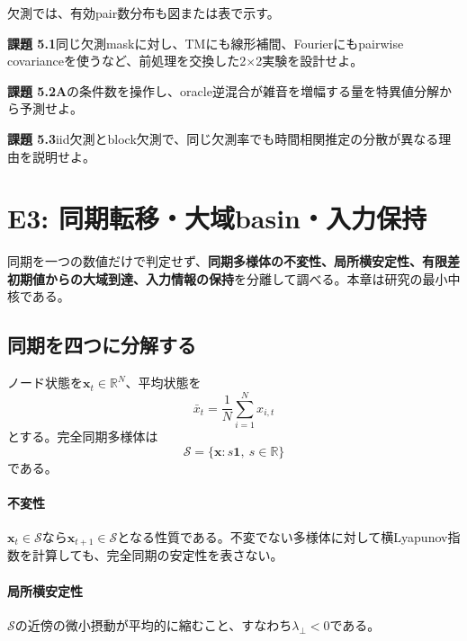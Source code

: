\documentclass[a4paper,11pt,oneside,openany]{ltjsbook}
\newcommand{\R}{\mathbb{R}}
\newcommand{\ones}{\bm{1}}
\newcommand{\vect}[1]{\bm{#1}}
\newcommand{\mat}[1]{\bm{#1}}
\begin{document}
欠測では、有効pair数分布も図または表で示す。

\begin{taskbox}
\textbf{課題 5.1}\quad 同じ欠測maskに対し、TMにも線形補間、Fourierにもpairwise covarianceを使うなど、前処理を交換した2\(\times\)2実験を設計せよ。

\medskip
\textbf{課題 5.2}\quad \(\mat A\)の条件数を操作し、oracle逆混合が雑音を増幅する量を特異値分解から予測せよ。

\medskip
\textbf{課題 5.3}\quad iid欠測とblock欠測で、同じ欠測率でも時間相関推定の分散が異なる理由を説明せよ。
\end{taskbox}

\chapter{E3: 同期転移・大域basin・入力保持}
\label{chap:e3}

\begin{purposebox}
同期を一つの数値だけで判定せず、\textbf{同期多様体の不変性、局所横安定性、有限差初期値からの大域到達、入力情報の保持}を分離して調べる。本章は研究の最小中核である。
\end{purposebox}

\section{同期を四つに分解する}

ノード状態を\(\vect x_t\in\R^N\)、平均状態を
\begin{equation}
  \bar x_t=\frac1N\sum_{i=1}^{N}x_{i,t}
\end{equation}
とする。完全同期多様体は
\begin{equation}
  \mathcal S=\{\vect x:s\ones,\ s\in\R\}
  \label{eq:synchronization_manifold}
\end{equation}
である。

\subsubsection*{不変性}
\(\vect x_t\in\mathcal S\)なら\(\vect x_{t+1}\in\mathcal S\)となる性質である。不変でない多様体に対して横Lyapunov指数を計算しても、完全同期の安定性を表さない。

\subsubsection*{局所横安定性}
\(\mathcal S\)の近傍の微小摂動が平均的に縮むこと、すなわち\(\lambda_\perp<0\)である。
\end{document}
